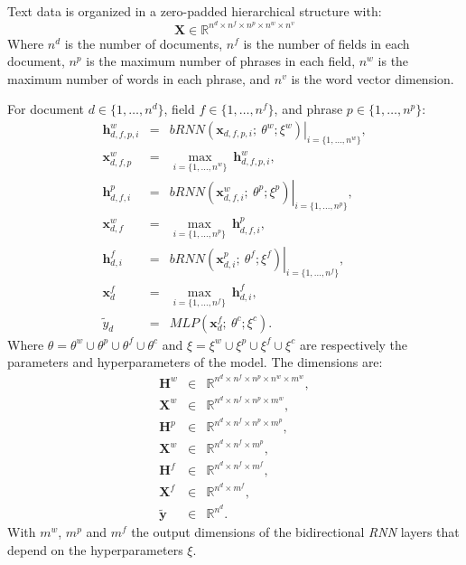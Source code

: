 \documentclass{article}
\newcommand{\matr}[1]{\bm{#1}}
\newcommand{\vect}[1]{\bm{#1}}
\def\mr{\mathbb{R}}
\begin{document}
Text data is organized in a zero-padded hierarchical structure with:
\begin{equation*}
  \matr{X}\in \mr^{n^d\times n^f\times n^p\times n^w\times n^v}
\end{equation*}
Where $n^d$ is the number of documents, $n^f$ is the number of fields
in each document, $n^p$ is the maximum number of phrases in each field, $n^w$
is the maximum number of words in each phrase, and $n^v$ is the word
vector dimension.

For document $d\in\{1,\dots,n^d\}$, field $f\in\{1,\dots,n^f\}$, and phrase $p\in\{1,\dots,n^p\}$:
\begin{eqnarray*}
  \vect{h}^w_{d,f,p,i}&=&\left. bRNN(\vect{x}_{d,f,p,i};\ \theta^w;\xi^w)\right\rvert_{i=\{1,\dots,n^w\}},\\
  \vect{x}^w_{d,f,p} &=& \max_{i=\{1,\dots,n^w\}}\ \vect{h}^w_{d,f,p,i},\\
  \vect{h}^p_{d,f,i}&=&\left. bRNN(\vect{x}^w_{d,f,i};\ \theta^p;\xi^p)\right\rvert_{i=\{1,\dots,n^p\}},\\
  \vect{x}^w_{d,f} &=& \max_{i=\{1,\dots,n^p\}}\ \vect{h}^p_{d,f,i},\\
  \vect{h}^f_{d,i}&=&\left. bRNN(\vect{x}^p_{d,i};\ \theta^f;\xi^f)\right\rvert_{i=\{1,\dots,n^f\}},\\
  \vect{x}^f_{d} &=& \max_{i=\{1,\dots,n^f\}}\ \vect{h}^f_{d,i},\\
  \tilde{y}_d &=& MLP(\vect{x}^f_d;\ \theta^c;\xi^c). 
\end{eqnarray*}
Where $\theta=\theta^w\cup\theta^p\cup\theta^f\cup\theta^c$ and
$\xi=\xi^w\cup\xi^p\cup\xi^f\cup\xi^c$ are respectively the
parameters and hyperparameters of the model. The dimensions are:
\begin{eqnarray*}
  \matr{H}^w &\in& \mr^{n^d\times n^f\times n^p\times n^w\times m^w},\\
  \matr{X}^w &\in& \mr^{n^d\times n^f\times n^p\times m^w},\\
  \matr{H}^p&\in& \mr^{n^d\times n^f\times n^p\times m^p},\\
  \matr{X}^w &\in& \mr^{n^d\times n^f\times m^p},\\
  \matr{H}^f&\in& \mr^{n^d\times n^f\times m^f},\\
  \matr{X}^f &\in& \mr^{n^d\times m^f},\\
  \vect{\tilde{y}} &\in& \mr^{n^d}. 
\end{eqnarray*}
With $m^w$, $m^p$ and $m^f$ the output dimensions of the bidirectional
\emph{RNN} layers that depend on the hyperparameters $\xi$.
\end{document}
